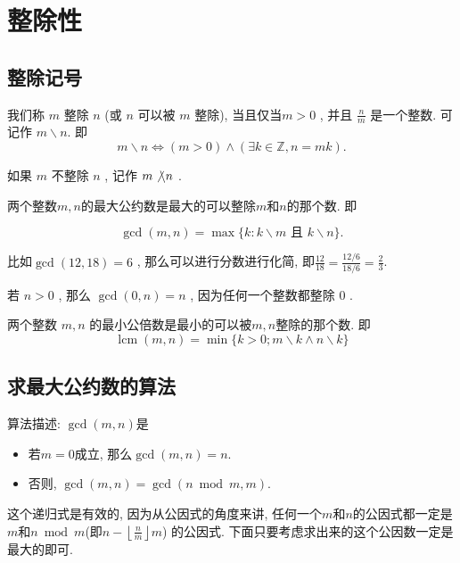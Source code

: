 \documentclass{ctexart}
\newcommand{\bzc}{\not\backslash}
\begin{document}
\section{整除性}

\subsection{整除记号}

\begin{definition}
    我们称 $m$ 整除 $n$ (或 $n$ 可以被 $m$ 整除), 当且仅当$m>0$ , 并且 $\frac{n}{m}$ 是一个整数. 可记作 $m \backslash n$. 即
$$
m \backslash n \Leftrightarrow(m>0) \wedge(\exists k \in \mathbb{Z}, n=m k) .
$$

如果 $m$ 不整除 $n$ , 记作 $m \bzc n$ . 

\end{definition}

\begin{definition}[最大公约数]
    两个整数$m, n$的最大公约数是最大的可以整除$m$和$n$的那个数. 即

    $$
\operatorname{gcd}(m, n)=\max \{k: k \backslash m \text { 且 } k \backslash n\} .
$$
\end{definition}

比如$\operatorname{gcd}(12,18)=6$ , 那么可以进行分数进行化简, 即$\frac{12}{18}=\frac{12 / 6}{18/6}=\frac{2}{3}$.

\begin{remark}
    若 $n>0$ , 那么 $\operatorname{gcd}(0, n)=n$ , 因为任何一个整数都整除 0 .
\end{remark}

\begin{definition}[最小公倍数]
    两个整数 $m,n$ 的最小公倍数是最小的可以被$m,n$整除的那个数. 即
    $$
\operatorname{lcm}(m, n)=\min \{k>0 ; m \backslash k \wedge n \backslash k\}
$$
\end{definition}

\subsection{求最大公约数的算法}

算法描述: $\gcd(m,n)$是
\begin{itemize}
    \item 若$m=0$成立, 那么$\gcd(m,n)=n$.
    \item 否则, $\gcd(m,n)=\gcd(n \bmod m, m)$.
\end{itemize}

这个递归式是有效的, 因为从公因式的角度来讲, 任何一个$m$和$n$的公因式都一定是$m$和$n \bmod m$(即$n-\left\lfloor\frac{n}{m}\right\rfloor m$) 的公因式. 下面只要考虑求出来的这个公因数一定是最大的即可. 
\end{document}
